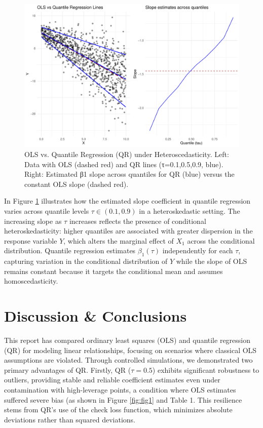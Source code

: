 \documentclass[fleqn,10pt]{latex/stylish_article} %
\begin{document}
\begin{figure}[h]

{\centering \includegraphics[width=0.8\linewidth]{ADR_project_draft_files/figure-latex/fig4-1} 

}

\caption{OLS vs. Quantile Regression (QR) under Heteroscedasticity. Left: Data with OLS (dashed red) and QR lines (τ=0.1,0.5,0.9, blue). Right: Estimated β1 slope across quantiles for QR (blue) versus the constant OLS slope (dashed red).}\label{fig:fig4}
\end{figure}

In Figure \ref{fig:fig4} illustrates how the estimated slope coefficient in quantile regression varies across quantile levels \(\tau \in (0.1, 0.9)\) in a heteroskedastic setting. The increasing slope as \(\tau\) increases reflects the presence of conditional heteroskedasticity: higher quantiles are associated with greater dispersion in the response variable \(Y\), which alters the marginal effect of \(X_1\) across the conditional distribution. Quantile regression estimates \(\beta_1(\tau)\) independently for each \(\tau\), capturing variation in the conditional distribution of \(Y\) while the slope of OLS remains constant because it targets the conditional mean and assumes homoscedasticity.

\section{Discussion \& Conclusions}\label{discussion-conclusions}

This report has compared ordinary least squares (OLS) and quantile regression (QR) for modeling linear relationships, focusing on scenarios where classical OLS assumptions are violated. Through controlled simulations, we demonstrated two primary advantages of QR. Firstly, QR (\(\tau=0.5\)) exhibits significant robustness to outliers, providing stable and reliable coefficient estimates even under contamination with high-leverage points, a condition where OLS estimates suffered severe bias (as shown in Figure \ref{fig:fig1} and Table 1. This resilience stems from QR's use of the check loss function, which minimizes absolute deviations rather than squared deviations.
\end{document}
